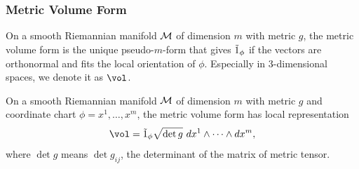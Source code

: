 \documentclass[../main.tex]{subfiles}
\begin{document}
    \subsubsection{Metric Volume Form}
    \begin{definition}\label{def:metric-volume-form}
        On a smooth Riemannian manifold \(\manifold[M]\) of dimension \(m\) with 
        metric \(g\), the metric volume form is the unique pseudo-\(m\)-form that 
        gives \(\pseudo{1}_\phi\) if the vectors are orthonormal and fits the local 
        orientation of \(\phi\). Especially in 3-dimensional spaces, we denote it 
        as \(\vol\).
    \end{definition}
    \begin{theorem}\label{thm:local-rep-metric-volume-form}
        On a smooth Riemannian manifold \(\manifold[M]\) of dimension \(m\) with 
        metric \(g\) and coordinate chart \(\phi=x^1, \dots, x^m\), the metric volume 
        form has local representation
        \[
        \vol = \pseudo{1}_\phi \sqrt{\det g}\ dx^1\wedge \dots\wedge dx^m,
        \]
        where \(\det g\) means \(\det g_{ij}\), the determinant of the matrix of 
        metric tensor.
    \end{theorem}
\end{document}
